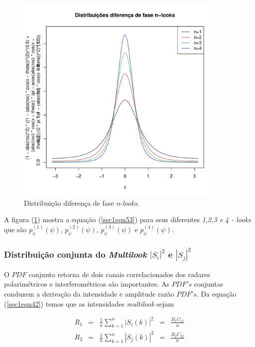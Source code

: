 \documentclass[12pt,a4paper]{article}
\begin{document}
\begin{figure}[!h]
\centering
\includegraphics[width=4.0in]{fig1_eq_18_lee_1994.pdf}
	\caption{Distribuição diferença de fase {\it n-looks}.}
\label{sec1fig1}
\end{figure}

A  figura (\ref{sec1fig1}) mostra a equação (\ref{sec1eqn53}) para seus diferentes {\it 1,2,3 e 4 - looks} que são $p_{\psi}^{(1)}(\psi)$, $p_{\psi}^{(2)}(\psi)$, $p_{\psi}^{(3)}(\psi)$ e $p_{\psi}^{(4)}(\psi)$.

\subsubsection{Distribuição conjunta do {\it Multilook} $|S_i|^2$ e $|S_j|^2$ }

O $PDF$ conjunto retorna de dois canais correlacionados dos radares polarimétricos e interferométricos são importantes. As $PDF's$ conjuntas conduzem a derivação da intensidade e amplitude razão $PDF's$. Da equação (\ref{sec1eqn42}) temos que as intensidades {\it multilook} sejam 

\begin{equation}\label{sec1eqn59}
\begin{array}{ccccc}
	R_1&=&\frac{1}{n}\displaystyle{\sum_{k=1}^{n}|S_i(k)|^2}&=&\frac{B_1C_{11}}{n}\\
	R_2&=&\frac{1}{n}\displaystyle{\sum_{k=1}^{n}|S_j(k)|^2}&=&\frac{B_2C_{22}}{n}\\
\end{array}
\end{equation}
\end{document}

